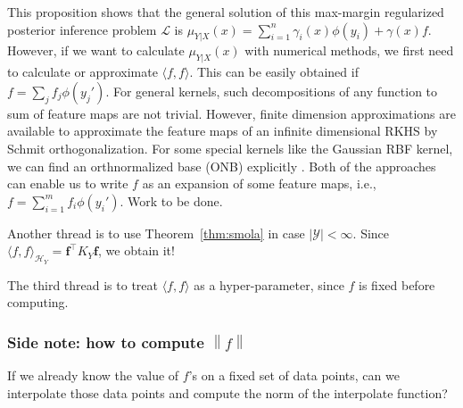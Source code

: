 \documentclass[a4paper]{article}
\renewcommand{\bf}{\mathbf}
\renewcommand{\cal}{\mathcal}
\newcommand{\norm}[1]{\left\lVert#1\right\rVert}
\newcommand{\T}{\intercal}
\newcommand{\thmref}[1]{Theorem~\ref{#1}}
\begin{document}
This proposition shows that the general solution of this max-margin regularized posterior inference problem $\cal{L}$ is $\mu_{Y|X}(x) = \sum_{i=1}^n \gamma_i(x) \phi(y_i) + \gamma(x) f$. However, if we want to calculate $\mu_{Y|X}(x)$ with numerical methods, we first need to calculate or approximate $\langle f,f \rangle$. This can be easily obtained if $f = \sum_j f_j\phi(y_j')$. For general kernels, such decompositions of any function to sum of feature maps are not trivial. However, finite dimension approximations \cite{rahimi2007random}\cite{oliva2015bayesian} are available to approximate the feature maps of an infinite dimensional RKHS by Schmit orthogonalization. For some special kernels like the Gaussian RBF kernel, we can find an orthnormalized base (ONB) explicitly \cite{steinwart2006explicit}. Both of the approaches can enable us to write $f$ as an expansion of some feature maps, i.e., $f = \sum_{i=1}^{m} f_i\phi(y_i')$. {\color{red} Work to be done.} 

Another thread is to use \thmref{thm:smola} in case $|\cal{Y}| < \infty$. Since $\langle f, f\rangle_{\cal{H}_Y} = \bf{f}^\T K_Y \bf{f}$, we obtain it! 

The third thread is to treat $\langle f,f\rangle$ as a hyper-parameter, since $f$ is fixed before computing.

\subsubsection{Side note: how to compute $\norm{f}$}
If we already know the value of $f$'s on a fixed set of data points, can we interpolate those data points and compute the norm of the interpolate function? 
\end{document}
